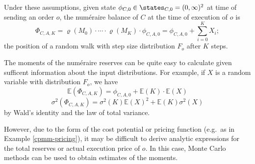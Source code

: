 \documentclass[a4paper,11pt]{article}
\begin{document}
Under these assumptions, given state $\phi_{C,0}\in\states_{C,0} = (0,\infty)^2$ at time of sending an order $o$, the num\'eraire balance of $C$ at the time of execution of $o$ is
\begin{equation}
  \Phi_{C,A,K} = \varrho(M_0)\cdot\cdots\cdot \varrho(M_K)\cdot \phi_{C,A,0} = \phi_{C,A,0} + \sum_{i=0}^{K} X_i;
\end{equation}
the position of a random walk with step size distribution $F_o$ after $K$ steps.

The moments of the num\'eraire reserves can be quite easy to calculate given sufficent information about the input distributions.
%
For example, if $X$ is a random variable with distribution $F_o$, we have
\begin{equation}
  \mathbb{E}(\Phi_{C,A,K}) = \phi_{C,A,0} + \mathbb{E}(K)\cdot\mathbb{E}(X)
\end{equation}
\begin{equation}
  \sigma^2(\Phi_{C,A,K}) = \sigma^2(K)\mathbb{E}(X)^2 + \mathbb{E}(K)\sigma^2(X)
\end{equation}
by Wald's identity and the law of total variance.

However, due to the form of the cost potential or pricing function (e.g.~as in Example \ref{cpmm-pricing}), it may be difficult to derive analytic expressions for the total reserves or actual execution price of $o$.
%
In this case, Monte Carlo methods can be used to obtain estimates of the moments.
\end{document}
